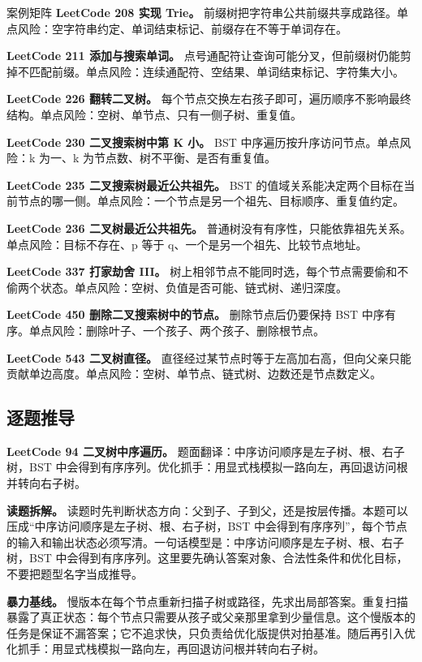 \begin{principlebox}{案例矩阵}
\textbf{LeetCode 208 实现 Trie。}
前缀树把字符串公共前缀共享成路径。单点风险：空字符串约定、单词结束标记、前缀存在不等于单词存在。

\textbf{LeetCode 211 添加与搜索单词。}
点号通配符让查询可能分叉，但前缀树仍能剪掉不匹配前缀。单点风险：连续通配符、空结果、单词结束标记、字符集大小。

\textbf{LeetCode 226 翻转二叉树。}
每个节点交换左右孩子即可，遍历顺序不影响最终结构。单点风险：空树、单节点、只有一侧子树、重复值。

\textbf{LeetCode 230 二叉搜索树中第 K 小。}
BST 中序遍历按升序访问节点。单点风险：k 为一、k 为节点数、树不平衡、是否有重复值。

\textbf{LeetCode 235 二叉搜索树最近公共祖先。}
BST 的值域关系能决定两个目标在当前节点的哪一侧。单点风险：一个节点是另一个祖先、目标顺序、重复值约定。

\textbf{LeetCode 236 二叉树最近公共祖先。}
普通树没有有序性，只能依靠祖先关系。单点风险：目标不存在、p 等于 q、一个是另一个祖先、比较节点地址。

\textbf{LeetCode 337 打家劫舍 III。}
树上相邻节点不能同时选，每个节点需要偷和不偷两个状态。单点风险：空树、负值是否可能、链式树、递归深度。

\textbf{LeetCode 450 删除二叉搜索树中的节点。}
删除节点后仍要保持 BST 中序有序。单点风险：删除叶子、一个孩子、两个孩子、删除根节点。

\textbf{LeetCode 543 二叉树直径。}
直径经过某节点时等于左高加右高，但向父亲只能贡献单边高度。单点风险：空树、单节点、链式树、边数还是节点数定义。

\end{principlebox}

\subsection{逐题推导}

\noindent\textbf{LeetCode 94 二叉树中序遍历。} 题面翻译：中序访问顺序是左子树、根、右子树，BST 中会得到有序序列。优化抓手：用显式栈模拟一路向左，再回退访问根并转向右子树。

\textbf{读题拆解。} 读题时先判断状态方向：父到子、子到父，还是按层传播。本题可以压成“中序访问顺序是左子树、根、右子树，BST 中会得到有序序列”，每个节点的输入和输出状态必须写清。一句话模型是：中序访问顺序是左子树、根、右子树，BST 中会得到有序序列。这里要先确认答案对象、合法性条件和优化目标，不要把题型名字当成推导。

\textbf{暴力基线。} 慢版本在每个节点重新扫描子树或路径，先求出局部答案。重复扫描暴露了真正状态：每个节点只需要从孩子或父亲那里拿到少量信息。这个慢版本的任务是保证不漏答案；它不追求快，只负责给优化版提供对拍基准。随后再引入优化抓手：用显式栈模拟一路向左，再回退访问根并转向右子树。

